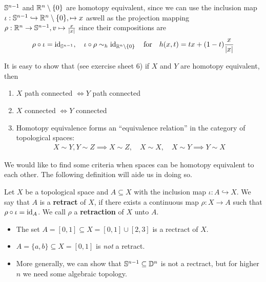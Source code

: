 
\begin{ex}[]
$\mathbb{S}^{n-1}$ and $\mathbb{R}^{n} \setminus \{0\}$ are homotopy equivalent, since we can use the inclusion map
$\iota: \mathbb{S}^{n-1} \hookrightarrow \mathbb{R}^{n} \setminus \{0\},  \mapsto  x
$
aswell as the projection mapping
$
  \rho: \mathbb{R}^{n} \to \mathbb{S}^{n-1}, v \mapsto \frac{x}{\vert x\vert}
$
since their compositions are
\begin{align*}
  \rho \circ \iota = \operatorname{id}_{\mathbb{S}^{n-1}}, \quad \iota \circ \rho \sim_h \operatorname{id}_{\mathbb{R}^{n} \setminus \{0\}}
  \quad \text{for} \quad 
  h(x,t) = tx + (1-t) \frac{x}{\vert x\vert}
\end{align*}
\end{ex}

\begin{rem}[]
  It is easy to show that (see exercise sheet 6) if $X$ and $Y$ are homotopy equivalent, then
  \begin{enumerate}
    \item $X$ path connected $\iff Y$ path connected
    \item $X$ connected $\iff Y$ connected
    \item Homotopy equivalence forms an ``equivalence relation'' in the category of topological spaces:
      \begin{align*}
        X \sim Y, Y \sim Z \implies X \sim Z, \quad X \sim X, \quad X \sim Y \implies Y \sim X
      \end{align*}
  \end{enumerate}
\end{rem}

We would like to find some criteria when spaces can be homotopy equivalent to each other. The following definition will aide us in doing so.

\begin{dfn}[] \label{dfn:retraction}
Let $X$ be a topological space and $A \subseteq X$ with the inclusion map $\iota: A \hookrightarrow X$.
We say that $A$ is a \textbf{retract} of $X$, if there exists a continuous map $\rho: X \to A$ such that $\rho \circ \iota= \operatorname{id}_A$.
We call $\rho$ a \textbf{retraction} of $X$ unto $A$.
\begin{center}
\end{center}
\end{dfn}
\begin{ex}[]
\begin{itemize}
  \item The set $A = [0,1] \subseteq X = [0,1] \cup [2,3]$ is a rectract of $X$.
  \item $A = \{a,b\} \subseteq X = [0,1]$ is \emph{not} a retract.
  \item More generally, we can show that $\mathbb{S}^{n-1} \subseteq \mathbb{D}^{n}$ is not a rectract, but for higher $n$ we need some algebraic topology.
\end{itemize}
\end{ex}



